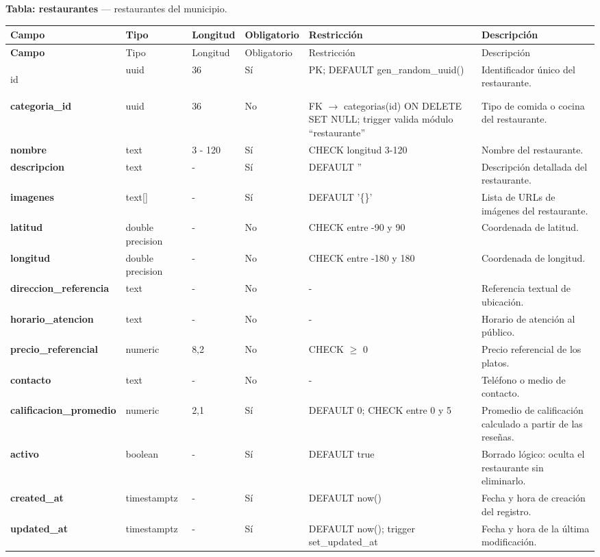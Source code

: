\bigskip
\noindent\textbf{Tabla: restaurantes} — restaurantes del municipio.

{\footnotesize
\begin{longtable}{|>{\bfseries}p{3.3cm}|p{2.6cm}|p{1.2cm}|p{1.6cm}|p{2.8cm}|p{4.0cm}|}
\hline
Campo & Tipo & Longitud & Obligatorio & Restricción & Descripción \\ \hline
\endfirsthead
\hline
Campo & Tipo & Longitud & Obligatorio & Restricción & Descripción \\ \hline
\endhead
\hline
\endfoot
\hline
\endlastfoot

id & uuid & 36 & Sí & PK; DEFAULT gen\_random\_uuid() & Identificador único del restaurante. \\ \hline
categoria\_id & uuid & 36 & No & FK $\rightarrow$ categorias(id) ON DELETE SET NULL; trigger valida módulo ``restaurante'' & Tipo de comida o cocina del restaurante. \\ \hline
nombre & text & 3 - 120 & Sí & CHECK longitud 3-120 & Nombre del restaurante. \\ \hline
descripcion & text & - & Sí & DEFAULT '' & Descripción detallada del restaurante. \\ \hline
imagenes & text[] & - & Sí & DEFAULT '\{\}' & Lista de URLs de imágenes del restaurante. \\ \hline
latitud & double precision & - & No & CHECK entre -90 y 90 & Coordenada de latitud. \\ \hline
longitud & double precision & - & No & CHECK entre -180 y 180 & Coordenada de longitud. \\ \hline
direccion\_referencia & text & - & No & - & Referencia textual de ubicación. \\ \hline
horario\_atencion & text & - & No & - & Horario de atención al público. \\ \hline
precio\_referencial & numeric & 8,2 & No & CHECK $\geq$ 0 & Precio referencial de los platos. \\ \hline
contacto & text & - & No & - & Teléfono o medio de contacto. \\ \hline
calificacion\_promedio & numeric & 2,1 & Sí & DEFAULT 0; CHECK entre 0 y 5 & Promedio de calificación calculado a partir de las reseñas. \\ \hline
activo & boolean & - & Sí & DEFAULT true & Borrado lógico: oculta el restaurante sin eliminarlo. \\ \hline
created\_at & timestamptz & - & Sí & DEFAULT now() & Fecha y hora de creación del registro. \\ \hline
updated\_at & timestamptz & - & Sí & DEFAULT now(); trigger set\_updated\_at & Fecha y hora de la última modificación. \\ \hline
\end{longtable}
}

